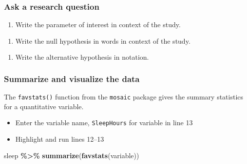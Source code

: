 \documentclass[
]{report}
\newenvironment{Shaded}{\begin{snugshade}}{\end{snugshade}}
\newcommand{\FunctionTok}[1]{\textcolor[rgb]{0.13,0.29,0.53}{\textbf{#1}}}
\newcommand{\NormalTok}[1]{#1}
\newcommand{\SpecialCharTok}[1]{\textcolor[rgb]{0.81,0.36,0.00}{\textbf{#1}}}
\providecommand{\tightlist}{%
  \setlength{\itemsep}{0pt}\setlength{\parskip}{0pt}}
\begin{document}
\subsubsection*{Ask a research question}\label{ask-a-research-question}

\begin{enumerate}
\def\labelenumi{\arabic{enumi}.}
\tightlist
\item
  Write the parameter of interest in context of the study.
\end{enumerate}

\vspace{1in}

\begin{enumerate}
\def\labelenumi{\arabic{enumi}.}
\setcounter{enumi}{1}
\tightlist
\item
  Write the null hypothesis in words in context of the study.
\end{enumerate}

\vspace{1in}

\begin{enumerate}
\def\labelenumi{\arabic{enumi}.}
\setcounter{enumi}{2}
\tightlist
\item
  Write the alternative hypothesis in notation.
\end{enumerate}

\vspace{0.4in}

\subsubsection*{Summarize and visualize the data}\label{summarize-and-visualize-the-data}

The \texttt{favstats()} function from the \texttt{mosaic} package gives the summary statistics for a quantitative variable.

\begin{itemize}
\item
  Enter the variable name, \texttt{SleepHours} for variable in line 13
\item
  Highlight and run lines 12--13
\end{itemize}

\begin{Shaded}
\begin{Highlighting}[]
\NormalTok{sleep }\SpecialCharTok{\%\textgreater{}\%}
    \FunctionTok{summarize}\NormalTok{(}\FunctionTok{favstats}\NormalTok{(variable))}
\end{Highlighting}
\end{Shaded}
\end{document}
